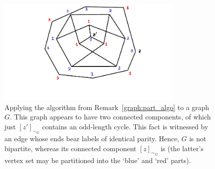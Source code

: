 \documentclass[12pt,notitlepage]{article}
\theoremstyle{plain}
\theoremstyle{definition}
\theoremstyle{plain}
\newcommand{\1}{\mathbf{1}}
\newcommand{\0}{\mathbf{0}}
\begin{document}
\begin{figure}[h]
	\centering
	\includegraphics*[width=0.8\textwidth]{graph_bipartite_algo.pdf}
	\caption{Applying the algorithm from Remark~\ref{graph:part_algo} to a graph $G$. This graph appears to have two connected components, of which just $[z']_{\sim_G}$ contains an odd-length cycle. This fact is witnessed by an edge whose ends bear labels of identical parity. Hence, $G$ is not bipartite, whereas its connected component $[z]_{\sim_G}$ is (the latter's vertex set may be partitioned into the `blue' and `red' parts).}
\end{figure}
\end{document}
